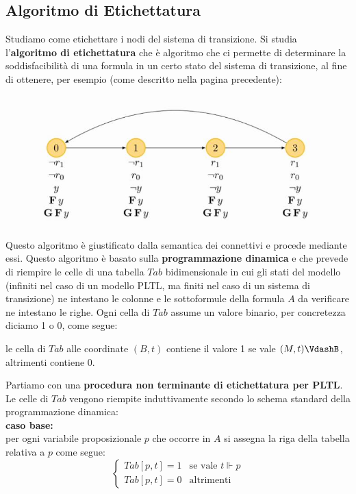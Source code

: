 \documentclass[a4paper,12pt, oneside]{book}
\begin{document}
\subsection{Algoritmo di Etichettatura}
Studiamo come etichettare i nodi del sistema di transizione. Si studia
l'\textbf{algoritmo di etichettatura} che è algoritmo che ci permette di
determinare la soddisfacibilità di una formula in un certo stato del sistema di
transizione, al fine di ottenere, per esempio (come descritto nella pagina
precedente): 
\begin{figure}[H]
  \centering
  \includegraphics[scale = 0.5]{img/4c.jpg}
\end{figure}
Questo algoritmo è giustificato dalla semantica dei connettivi e procede
mediante essi. Questo algoritmo è basato sulla \textbf{programmazione dinamica}
e che prevede di riempire le celle di una tabella $Tab$ bidimensionale in cui
gli stati del modello (infiniti nel caso di un modello PLTL, ma finiti nel caso
di un sistema di transizione) ne intestano le colonne e le sottoformule della
formula $A$ da verificare ne intestano le righe. Ogni cella di $Tab$ assume un
valore binario, per concretezza diciamo 1 o 0, come 
segue:
\begin{center}
  le cella di $Tab$ alle coordinate $(B, t)$ contiene il valore 1 se vale
  $(M,t)\VdashB$, altrimenti contiene 0.  
\end{center}
Partiamo con una \textbf{procedura non terminante di etichettatura per PLTL}.\\
Le celle di $Tab$ vengono riempite induttivamente secondo lo schema standard
della programmazione dinamica:\\
\textbf{caso base:}\\
per ogni variabile proposizionale $p$ che occorre in $A$ si assegna la riga
della tabella relativa a $p$ come segue:
\[
  \begin{cases}
    Tab[p, t] = 1 &\mbox{se vale } t\Vdash p\\
    Tab[p, t] = 0 &\mbox{altrimenti}
  \end{cases}
\]
\end{document}
